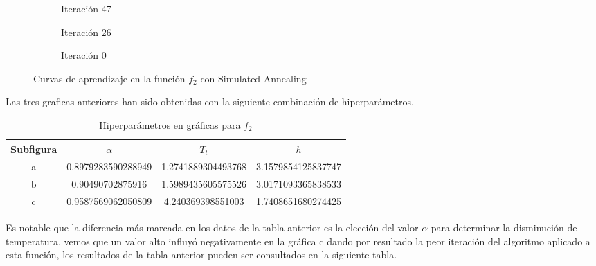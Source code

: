 \begin{figure}[h!]
     \centering
     \begin{subfigure}[b]{0.45\textwidth}
         \centering
         
         \caption{Iteración 47}
         \label{fig:learning-Simulated-Annealing-f0-72}
     \end{subfigure}
     \hfill
     \begin{subfigure}[b]{0.45\textwidth}
         \centering
         
         \caption{Iteración 26}
         \label{fig:learning-Simulated-Annealing-f0-9}
     \end{subfigure}
     \hfill
     \begin{subfigure}[b]{0.45\textwidth}
         \centering
         
         \caption{Iteración 0}
         \label{fig:learning-vanilla-f0-7}
     \end{subfigure}
        \caption{Curvas de aprendizaje en la función $f_2$ con Simulated Annealing}
        \label{fig:learning-curves-f0}
\end{figure}

Las tres graficas anteriores han sido obtenidas con la siguiente combinación de hiperparámetros.

\begin{table}[H]
    \centering
    \caption{Hiperparámetros en gráficas para $f_2$}
    \begin{tabular}{|c|c|c|c|}
    \hline
    \textbf{Subfigura} & \textbf{$\alpha$} & \textbf{$T_t$} & \textbf{$h$}\\
    \hline
    a &  0.8979283590288949 & 1.2741889304493768 & 3.1579854125837747\\
    \hline
    b & 0.90490702875916 & 1.5989435605575526 & 3.0171093365838533 \\
    \hline
    c & 0.9587569062050809 & 4.240369398551003 & 1.7408651680274425 \\
    \hline
    \end{tabular}
    \label{tab:hiper_simul_f2}
\end{table}

Es notable que la diferencia más marcada en los datos de la tabla anterior es la elección del valor $\alpha$ para determinar la disminución de temperatura, vemos que un valor alto influyó negativamente en la gráfica c dando por resultado la peor iteración del algoritmo aplicado a esta función, los resultados de la tabla anterior pueden ser consultados en la siguiente tabla.



